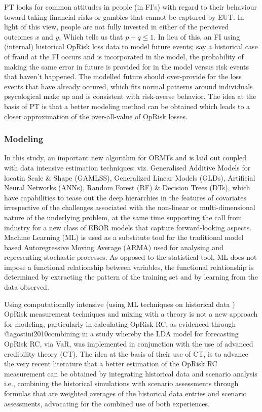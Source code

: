 \documentclass[]{article}
\begin{document}
PT looks for common attitudes in people (in FI's) with regard to their
behaviour toward taking financial risks or gambles that cannot be
captured by EUT. In light of this view, people are not fully invested in
either of the percieved outcomes \(x\) and \(y\), Which tells us that
\(p+q \leq 1\). In lieu of this, an FI using (internal) historical
OpRisk loss data to model future events; say a historical case of fraud
at the FI occurs and is incorporated in the model, the probability of
making the same error in future is provided for in the model versus risk
events that haven't happened. The modelled future should over-provide
for the loss events that have already occured, which fits normal
patterns around individuals psycological make up and is consistent with
risk-averse behavior. The idea at the basis of PT is that a better
modeling method can be obtained which leads to a closer approximation of
the over-all-value of OpRisk losses.

\subsubsection{Modeling}

In this study, an important new algorithm for ORMFs and is laid out
coupled with data intensive estimation techniques; viz. Generalised
Additive Models for locatin Scale \& Shape (GAMLSS), Generalized Linear
Models (GLDs), Artificial Neural Networks (ANNs), Random Forest (RF) \&
Decision Trees (DTs), which have capabilities to tease out the deep
hierarchies in the features of covariates irrespective of the challenges
associated with the non-linear or multi-dimensional nature of the
underlying problem, at the same time supporting the call from industry
for a new class of EBOR models that capture forward-looking aspects.
Machine Learning (ML) is used as a substitute tool for the traditional
model based Autoregressive Moving Average (ARMA) used for analysing and
representing stochastic processes. As opposed to the statistical tool,
ML does not impose a functional relationship between variables, the
functional relationship is determined by extracting the pattern of the
training set and by learning from the data observed.\medskip 

Using computationally intensive (using ML techniques on historical data
) OpRisk measurement techniques and mixing with a theory is not a new
approach for modeling, particularly in calculating OpRisk RC; as
evidenced through @agostini2010combining in a study whereby the LDA
model for forecasting OpRisk RC, via VaR, was implemented in conjunction
with the use of advanced credibility theory (CT). The idea at the basis
of their use of CT, is to advance the very recent literature that a
better estimation of the OpRisk RC measurement can be obtained by
integrating historical data and scenario analysis i.e., combining the
historical simulations with scenario assessments through formulas that
are weighted averages of the historical data entries and scenario
assessments, advocating for the combined use of both
experiences.\medskip 
\end{document}
